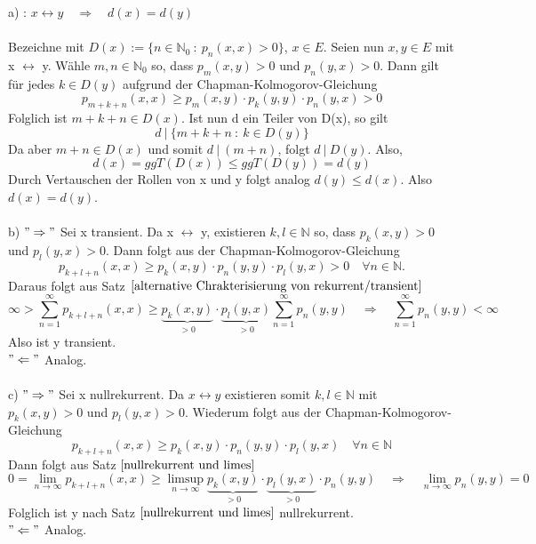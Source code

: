 a) : $x \leftrightarrow y \quad \Rightarrow \quad d(x) = d(y)$
\\
\\
Bezeichne mit $D(x) := \lbrace n \in \mathbb{N}_{0} \: : \: p_{n}(x,x)>0 \rbrace$, $x \in E$. Seien nun $x,y \in E$ mit x $\leftrightarrow$ y. Wähle $m,n \in \mathbb{N}_{0}$ so, dass $p_{m}(x,y)>0$ und $p_{n}(y,x)>0$. Dann gilt für jedes $k \in D(y)$ aufgrund der Chapman-Kolmogorov-Gleichung
\begin{equation*}
p_{m+k+n}(x,x) \geq p_{m}(x,y) \cdot p_{k}(y,y) \cdot p_{n}(y,x) > 0
\end{equation*}
Folglich ist $m+k+n \in D(x)$. Ist nun d ein Teiler von D(x), so gilt
\begin{equation*}
 d \: | \: \lbrace m+k+n \: : \: k \in D(y) \rbrace
\end{equation*} 
Da aber $m+n \in D(x)$ und somit $d \: | \: (m+n)$, folgt $d \: | \: D(y)$. Also, 
\begin{equation*}
d(x) = ggT(D(x)) \leq ggT(D(y)) = d(y)
\end{equation*}
Durch Vertauschen der Rollen von x und y folgt analog $d(y) \leq d(x)$. Also $d(x) = d(y)$.
\\
\\
b) $"\Rightarrow"$ Sei x transient. Da x $\leftrightarrow$ y, existieren $k,l \in \mathbb{N}$ so, dass  $p_{k}(x,y)>0$ und $p_{l}(y,x)>0$. Dann folgt aus der Chapman-Kolmogorov-Gleichung
\begin{equation*}
p_{k+l+n}(x,x) \geq p_{k}(x,y) \cdot p_{n}(y,y) \cdot p_{l}(y,x) > 0 \quad \forall n \in \mathbb{N}.
\end{equation*}
Daraus folgt aus Satz $\ref{alternative Chrakterisierung von rekurrent/transient}$ 
\begin{equation*}
\infty > \sum_{n=1}^{\infty} p_{k+l+n}(x,x) \geq \underbrace{p_{k}(x,y)}_{>0} \cdot \underbrace{p_{l}(y,x)}_{>0} \sum_{n=1}^{\infty} p_{n}(y,y) \quad \Rightarrow \quad \sum_{n=1}^{\infty} p_{n}(y,y) < \infty
\end{equation*}
Also ist y transient.
\\
$"\Leftarrow"$ Analog.
\\
\\
c) \: $"\Rightarrow"$ Sei x nullrekurrent. Da $x \leftrightarrow y$ existieren somit $k,l \in \mathbb{N}$ mit $p_{k}(x,y) > 0$ und $p_{l}(y,x) > 0$. Wiederum folgt aus der Chapman-Kolmogorov-Gleichung
\begin{equation*}
p_{k+l+n}(x,x) \geq p_{k}(x,y) \cdot p_{n}(y,y) \cdot p_{l}(y,x) \quad \forall n \in \mathbb{N}
\end{equation*}
Dann folgt aus Satz $\ref{nullrekurrent und limes}$
\begin{equation*}
0 = \lim_{n \to \infty}p_{k+l+n}(x,x) \geq \limsup_{n \to \infty} \underbrace{p_{k}(x,y)}_{>0} \cdot \underbrace{p_{l}(y,x)}_{>0} \cdot p_{n}(y,y) \quad \Rightarrow \quad \lim_{n \to \infty} p_{n}(y,y) = 0
\end{equation*}
Folglich ist y nach Satz $\ref{nullrekurrent und limes}$ nullrekurrent.
\\
$"\Leftarrow"$ Analog.